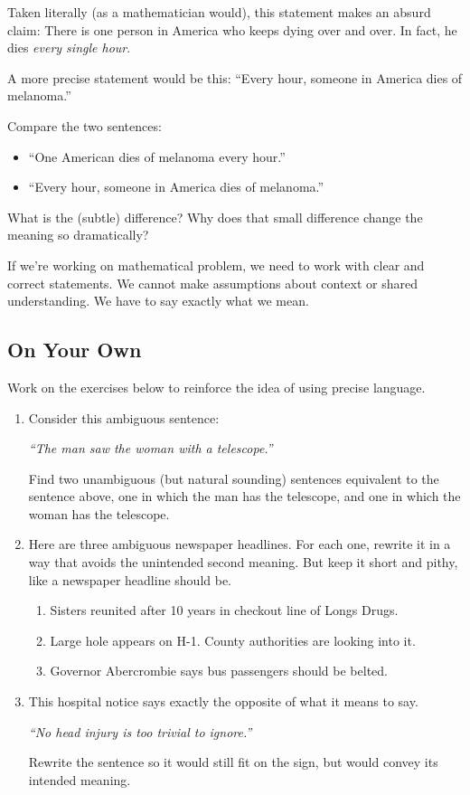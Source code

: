 Taken literally (as a mathematician would), this statement makes an absurd claim:  There is one person in America who keeps dying over and over.  In fact, he dies \emph{every single hour}.

A more precise statement would be this:
``Every hour, someone in America dies of melanoma.''

\begin{thinkpair*}
Compare the two sentences:
\begin{itemize}
\item
``One American dies of melanoma every hour.''
\item
``Every hour, someone in America dies of melanoma.''
\end{itemize}
What is the (subtle) difference?  Why does that small difference change the meaning so dramatically?

\end{thinkpair*}

 If we're working on mathematical problem, we need to work with clear and correct statements.  We cannot make assumptions about context or shared understanding.  We have to say exactly what we mean.

\subsection*{On Your Own}
Work on the exercises below to reinforce the idea of using precise language.
\begin{enumerate}
\item
Consider this ambiguous sentence:
\begin{center}
\emph{``The man saw
the woman with a telescope.''} 
\end{center}
Find two unambiguous (but natural sounding) sentences equivalent to the sentence above, one in which the
 man has the telescope, and one in which  the woman
has the telescope.
 
 
 \item
Here are three ambiguous newspaper headlines.  For each one, rewrite it in a way that avoids the unintended second meaning.  But keep it short and pithy, like a newspaper headline should be.

\begin{enumerate}
\item
Sisters reunited after 10 years in checkout line of Longs Drugs.
\item
Large hole appears on H-1.  County authorities are looking into it.
\item
Governor Abercrombie says bus passengers should be belted.

\end{enumerate}


 \item
This hospital notice says exactly the opposite of what it means to say.
 \begin{center}
\emph{``No head injury is too trivial to ignore.''} 
\end{center}
Rewrite the sentence so it would still fit on the sign, but would convey its intended meaning.



\end{enumerate}


